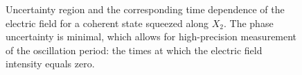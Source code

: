 \begin{figure}
\centering



\caption{Uncertainty region and the corresponding time dependence of the electric field for a coherent state squeezed along $X_2$. The phase uncertainty is minimal, which allows for high-precision measurement of the oscillation period: the times at which the electric field intensity equals zero.}
\label{figPart3Squeezed_3}
\end{figure}
